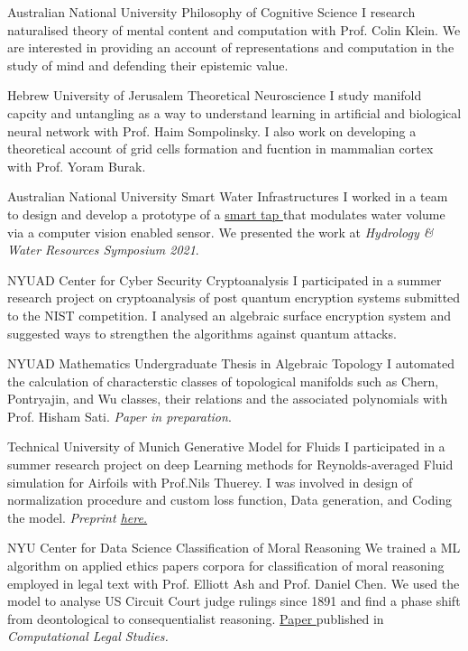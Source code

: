 {Australian National University}
{Philosophy of Cognitive Science}
{
	I research naturalised theory of mental content and computation with Prof. Colin Klein. We are interested in providing an account of representations and computation in the study of mind and defending their epistemic value.
}

{Hebrew University of Jerusalem}
{Theoretical Neuroscience}
{
	I study manifold capcity and untangling as a way to understand learning in artificial and biological neural network with Prof. Haim Sompolinsky. I also work on developing a theoretical account of grid cells formation and fucntion in mammalian cortex with Prof. Yoram Burak.  
}

{Australian National University}
{Smart Water Infrastructures}
{
	I worked in a team to design and develop a prototype of a 
	\href{http://tappyvision.herokuapp.com}{
		smart tap
	}that modulates water volume via a computer vision enabled sensor. We presented the work at \textit{Hydrology \& Water Resources Symposium 2021}.
}

{NYUAD Center for Cyber Security}
{Cryptoanalysis}
{
	I participated in a summer research project on cryptoanalysis of post quantum encryption systems submitted to the NIST competition. I analysed an algebraic surface encryption system and suggested ways to strengthen the algorithms against quantum attacks.
}

{NYUAD Mathematics}
{Undergraduate Thesis in Algebraic Topology}
{
	I automated the calculation of characterstic classes of topological manifolds such as Chern, Pontryajin, and Wu classes, their relations and the associated polynomials with Prof. Hisham Sati. \textit{Paper in preparation}.
}

{Technical University of Munich}
{Generative Model for Fluids}
{
	I participated in a summer research project on deep Learning methods for Reynolds-averaged Fluid simulation for Airfoils with Prof.Nils Thuerey. I was involved in design of normalization procedure and custom loss function, Data generation, and Coding the model. 
	\textit{ Preprint
		\href{https://www.researchgate.net/publication/328418525_Well_how_accurate_is_it_A_Study_of_Deep_Learning_Methods_for_Reynolds-Averaged_Navier-Stokes_Simulations}{
		here.
		}
	}
}

{NYU Center for Data Science}
{Classification of Moral Reasoning}
{
	We trained a ML algorithm on applied ethics papers corpora for classification of moral reasoning employed in legal text with Prof. Elliott Ash and Prof. Daniel Chen. We used the model to analyse US Circuit Court judge rulings since 1891 and find a phase shift from deontological to consequentialist reasoning.
	\href{https://papers.ssrn.com/sol3/papers.cfm?abstract_id=3205286}{
		Paper
		}published in \textit{Computational Legal Studies.}
}
